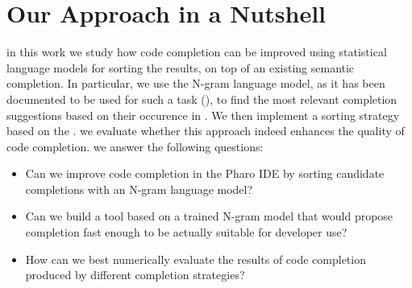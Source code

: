 \section{Our Approach in a Nutshell}
\label{sec:Introduction-Approach}
in this work we study how code completion can be improved using statistical language models for sorting the results, on top of an  existing semantic completion. In particular, we use the N-gram language model, as it has been documented to be used for such a task (\cite{Hind12a}), to find the most relevant completion suggestions based on their occurence in  . We then implement a sorting strategy based on the  . we evaluate whether this approach indeed enhances the quality of code completion. we answer the following questions:
\begin{itemize}
    \item Can we improve  code completion in the Pharo IDE by sorting candidate completions with an N-gram language model?
    \item Can we build a tool based on a trained N-gram model that would propose completion fast enough to be actually suitable for developer use? 
    \item How can we best numerically evaluate the results of code completion produced by different completion strategies?
\end{itemize}

